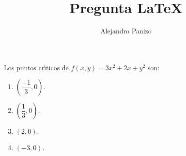 \documentclass[10pt,spanish,hyperref={pdfpagelabels=false}]{beamer}
\author{Alejandro Panizo}
\title{Pregunta \LaTeX}
\begin{document}
\Large

\rightskip=0pt

\begin{frame}

Los puntos cr\'{\i}ticos de  $f(x,y)=3x^2+2x+y^2 $ son:

\medskip

\begin{enumerate}[1.] \rightskip=0pt
\item  $(\dfrac{-1}{3},0)$.
\item  $(\dfrac{1}{3},0)$.
\item  $(2,0)$.
\item  $(-3,0)$.
\end{enumerate}


\end{frame}
\end{document}

